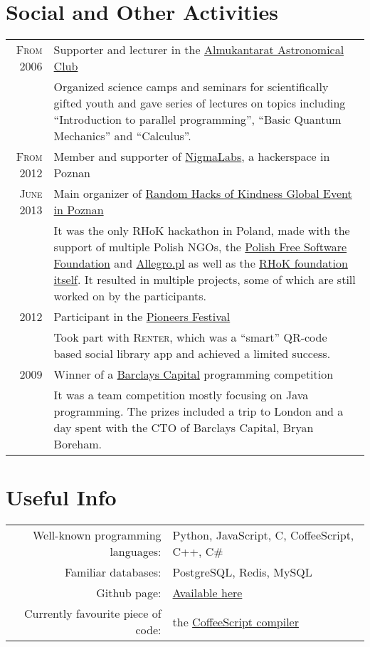 \documentclass[a4paper,10pt]{article}
\begin{document}
\section{Social and Other Activities}
\begin{tabular}{rp{11cm}}
    \textsc{From 2006} & Supporter and lecturer in the \href{http://almukantarat.pl/}{Almukantarat Astronomical Club}\\
    &\footnotesize{Organized science camps and seminars for scientifically gifted youth and gave series of lectures on topics including ``Introduction to parallel programming'', ``Basic Quantum Mechanics'' and ``Calculus''.} \\

    \textsc{From 2012} & Member and supporter of \href{http://nigmalabs.org/}{NigmaLabs}, a hackerspace in Poznan \\
    \textsc{June 2013} & Main organizer of \href{http://rhok.bazzle.me}{Random Hacks of Kindness Global Event in Poznan}\\
    &\footnotesize{It was the only RHoK hackathon in Poland, made with the support of multiple Polish NGOs, the \href{http://www.fwioo.pl/}{Polish Free Software Foundation} and \href{http://allegro.pl/}{Allegro.pl} as well as the \href{http://www.rhok.org/}{RHoK foundation itself}. It resulted in multiple projects, some of which are still worked on by the participants.} \\

    \textsc{2012} & Participant in the \href{http://pioneers.io/festival}{Pioneers Festival}\\
    &\footnotesize{Took part with \textsc{Renter}, which was a ``smart'' QR-code based social library app and achieved a limited success.} \\
    \textsc{2009} & Winner of a \href{http://www.barcap.com/}{Barclays Capital} programming competition\\
    &\footnotesize{It was a team competition mostly focusing on Java programming. The prizes included a trip to London and a day spent with the CTO of Barclays Capital, Bryan Boreham.}


\end{tabular}

\section{Useful Info}
\begin{tabular}{rl}
 Well-known programming languages:& Python, JavaScript, C, CoffeeScript, C++, C\#\\
 Familiar databases:& PostgreSQL, Redis, MySQL\\
 Github page:& \href{https://github.com/mkawalec}{Available here}\\
 Currently favourite piece of code:& the \href{https://github.com/jashkenas/coffee-script}{CoffeeScript compiler}
\end{tabular}
\end{document}
